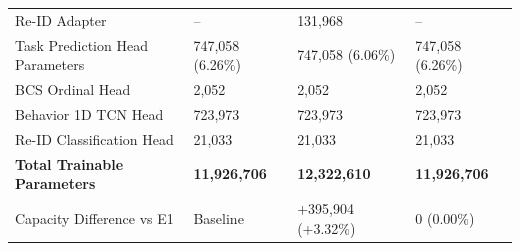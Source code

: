 \begin{table}[htbp]
\begin{tabularx}{\textwidth}{l Y Y Y}
\quad Re-ID Adapter & -- & 131,968 & -- \\
Task Prediction Head Parameters & 747,058 (6.26\%) & 747,058 (6.06\%) & 747,058 (6.26\%) \\
\quad BCS Ordinal Head & 2,052 & 2,052 & 2,052 \\
\quad Behavior 1D TCN Head & 723,973 & 723,973 & 723,973 \\
\quad Re-ID Classification Head & 21,033 & 21,033 & 21,033 \\
\midrule
\textbf{Total Trainable Parameters} & \textbf{11,926,706} & \textbf{12,322,610} & \textbf{11,926,706} \\
Capacity Difference vs E1 & Baseline & +395,904 (+3.32\%) & 0 (0.00\%) \\
\bottomrule
\end{tabularx}
\end{table}

